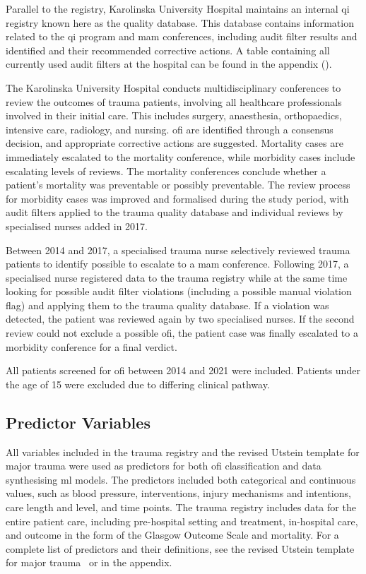 \documentclass[12pt, a4paper]{article}
\begin{document}
Parallel to the registry, Karolinska University Hospital maintains an internal \acrshort{qi} registry known here as the
quality database. This database contains information related to the \acrshort{qi} program and \acrshort{mam}
conferences, including audit filter results and identified  and their recommended corrective actions. A
table containing all currently used audit filters at the hospital can be found in the appendix
().

The Karolinska University Hospital conducts multidisciplinary conferences to review the outcomes of trauma patients,
involving all healthcare professionals involved in their initial care. This includes surgery, anaesthesia,
orthopaedics, intensive care, radiology, and nursing. \acrshort{ofi} are identified through a consensus decision, and
appropriate corrective actions are suggested. Mortality cases are immediately escalated to the mortality conference,
while morbidity cases include escalating levels of reviews. The mortality conferences conclude whether a patient's
mortality was preventable or possibly preventable. The review process for morbidity cases was improved and formalised
during the study period, with audit filters applied to the trauma quality database and individual reviews by
specialised nurses added in 2017.

Between 2014 and 2017, a specialised trauma nurse selectively reviewed trauma patients to identify possible
 to escalate to a \acrshort{mam} conference. Following 2017, a specialised nurse registered data to the
trauma registry while at the same time looking for possible audit filter violations (including a possible manual
violation flag) and applying them to the trauma quality database. If a violation was detected, the patient was reviewed
again by two specialised nurses. If the second review could not exclude a possible \acrshort{ofi}, the patient case was
finally escalated to a morbidity conference for a final verdict.

All patients screened for \acrshort{ofi} between 2014 and 2021 were included. Patients under the age of 15 were
excluded due to differing clinical pathway.

\subsection{Predictor Variables}
All variables included in the trauma registry and the revised Utstein template for major trauma were used as predictors
for both \acrshort{ofi} classification and data synthesising \acrshort{ml} models. The predictors included both
categorical and continuous values, such as blood pressure, interventions, injury mechanisms and intentions, care length
and level, and time points. The trauma registry includes data for the entire patient care, including pre-hospital
setting and treatment, in-hospital care, and outcome in the form of the Glasgow Outcome Scale and mortality. For a
complete list of predictors and their definitions, see the revised Utstein template for major
trauma~\cite{ringdal_utstein_2008} or  in the appendix.
\end{document}
